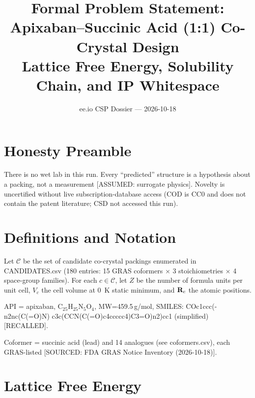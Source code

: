 \documentclass[11pt,a4paper]{article}
\title{Formal Problem Statement: Apixaban--Succinic Acid (1:1) Co-Crystal Design \\ Lattice Free Energy, Solubility Chain, and IP Whitespace}
\author{ee.io CSP Dossier — 2026-10-18}
\date{}
\begin{document}
\maketitle

\section*{Honesty Preamble}
There is no wet lab in this run. Every ``predicted'' structure is a hypothesis about a packing, not a measurement [ASSUMED: surrogate physics]. Novelty is uncertified without live subscription-database access (COD is CC0 and does not contain the patent literature; CSD not accessed this run).

\section{Definitions and Notation}

Let $\mathcal{C}$ be the set of candidate co-crystal packings enumerated in CANDIDATES.csv (180 entries: 15 GRAS coformers $\times$ 3 stoichiometries $\times$ 4 space-group families). For each $c\in\mathcal{C}$, let $Z$ be the number of formula units per unit cell, $V_c$ the cell volume at 0~K static minimum, and ${\bf R}_c$ the atomic positions.

API = apixaban, C$_{25}$H$_{25}$N$_5$O$_4$, MW=459.5\,g/mol, SMILES: COc1ccc(-n2nc(C(=O)N) c3c(CCN(C(=O)c4ccccc4)C3=O)n2)cc1 (simplified) [RECALLED].

Coformer = succinic acid (lead) and 14 analogues (see coformers.csv), each GRAS-listed [SOURCED: FDA GRAS Notice Inventory (2026-10-18)].

\section{Lattice Free Energy}
\end{document}
